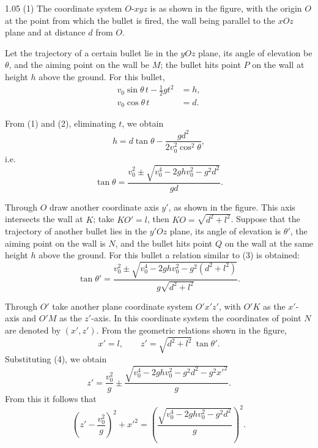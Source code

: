 \begin{solution}{1.05}
(1) The coordinate system $O$-$xyz$ is as shown in the figure, with the origin $O$ at the point
from which the bullet is fired, the wall being parallel to the $xOz$ plane and at distance $d$
from $O$.

Let the trajectory of a certain bullet lie in the $yOz$ plane, its angle of elevation be
$\theta$, and the aiming point on the wall be $M$; the bullet hits point $P$ on the wall at
height $h$ above the ground. For this bullet,
\begin{align}
v_0\sin\theta\,t-\frac{1}{2}gt^2 &= h, \tag{1}\\
v_0\cos\theta\,t &= d. \tag{2}
\end{align}

From (1) and (2), eliminating $t$, we obtain
\begin{equation*}
h = d\tan\theta-\frac{gd^2}{2v_0^2\cos^2\theta},
\end{equation*}
i.e.
\begin{equation}
\tan\theta = \frac{v_0^2\pm\sqrt{v_0^4-2ghv_0^2-g^2d^2}}{gd}. \tag{3}
\end{equation}

Through $O$ draw another coordinate axis $y'$, as shown in the figure. This axis intersects the
wall at $K$; take $KO'=l$, then $KO=\sqrt{d^2+l^2}$. Suppose that the trajectory of another
bullet lies in the $y'Oz$ plane, its angle of elevation is $\theta'$, the aiming point on the
wall is $N$, and the bullet hits point $Q$ on the wall at the same height $h$ above the ground.
For this bullet a relation similar to (3) is obtained:
\begin{equation}
\tan\theta' = \frac{v_0^2\pm\sqrt{v_0^4-2ghv_0^2-g^2(d^2+l^2)}}{g\sqrt{d^2+l^2}}. \tag{4}
\end{equation}

Through $O'$ take another plane coordinate system $O'x'z'$, with $O'K$ as the $x'$-axis and
$O'M$ as the $z'$-axis. In this coordinate system the coordinates of point $N$ are denoted by
$(x',z')$. From the geometric relations shown in the figure,
\begin{equation*}
x' = l,\qquad z' = \sqrt{d^2+l^2}\,\tan\theta'.
\end{equation*}
Substituting (4), we obtain
\begin{equation*}
z' = \frac{v_0^2}{g}\pm\frac{\sqrt{v_0^4-2ghv_0^2-g^2d^2-g^2x'^2}}{g}.
\end{equation*}
From this it follows that
\begin{equation}
\left(z'-\frac{v_0^2}{g}\right)^2+x'^2
= \left(\frac{\sqrt{v_0^4-2ghv_0^2-g^2d^2}}{g}\right)^2. \tag{5}
\end{equation}


\end{solution}
